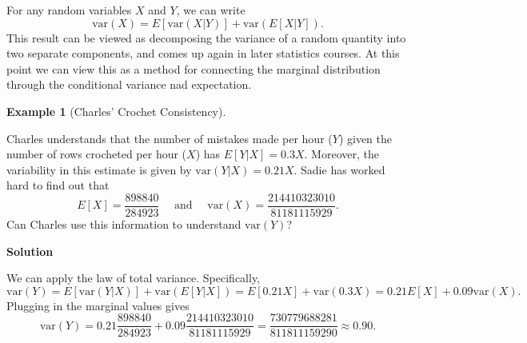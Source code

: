 \documentclass[
  letterpaper,
  DIV=11,
  numbers=noendperiod]{scrreprt}
\theoremstyle{definition}
\theoremstyle{definition}
\newtheorem{example}{Example}[chapter]
\theoremstyle{definition}
\theoremstyle{remark}
\begin{document}
\begin{tcolorbox}[enhanced jigsaw, coltitle=black, colframe=quarto-callout-tip-color-frame, colbacktitle=quarto-callout-tip-color!10!white, bottomrule=.15mm, opacitybacktitle=0.6, colback=white, toptitle=1mm, arc=.35mm, leftrule=.75mm, bottomtitle=1mm, opacityback=0, breakable, rightrule=.15mm, title={The Law of Total Variance}, left=2mm, titlerule=0mm, toprule=.15mm]

For any random variables \(X\) and \(Y\), we can write
\[\text{var}(X) = E[\text{var}(X|Y)] + \text{var}(E[X|Y]).\] This result
can be viewed as decomposing the variance of a random quantity into two
separate components, and comes up again in later statistics courses. At
this point we can view this as a method for connecting the marginal
distribution through the conditional variance nad expectation.

\end{tcolorbox}

\begin{example}[Charles' Crochet
Consistency]\protect\hypertarget{exm-law-of-total-variance}{}\label{exm-law-of-total-variance}

Charles understands that the number of mistakes made per hour (\(Y\))
given the number of rows crocheted per hour (\(X\)) has
\(E[Y|X] = 0.3X\). Moreover, the variability in this estimate is given
by \(\text{var}(Y|X) = 0.21X\). Sadie has worked hard to find out that
\[E[X] = \frac{898840}{284923} \quad\text{ and }\quad \text{var}(X) = \frac{214410323010}{81181115929}.\]
Can Charles use this information to understand \(\text{var}(Y)\)?

\begin{tcolorbox}[enhanced jigsaw, colback=white, colframe=quarto-callout-color-frame, arc=.35mm, leftrule=.75mm, rightrule=.15mm, opacityback=0, breakable, bottomrule=.15mm, left=2mm, toprule=.15mm]

\vspace{-3mm}\textbf{Solution}\vspace{3mm}

We can apply the law of total variance. Specifically,
\[\text{var}(Y) = E[\text{var}(Y|X)] + \text{var}(E[Y|X]) = E[0.21X] + \text{var}(0.3X) = 0.21E[X] + 0.09\text{var}(X).\]
Plugging in the marginal values gives
\[\text{var}(Y) = 0.21\frac{898840}{284923} + 0.09\frac{214410323010}{81181115929} = \frac{730779688281}{811811159290} \approx 0.90.\]

\end{tcolorbox}

\end{example}
\end{document}
